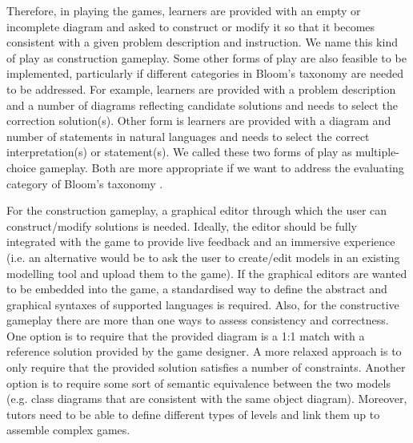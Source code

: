 \documentclass[conference]{IEEEtran}
\begin{document}
Therefore, in playing the games, learners are provided with an empty or incomplete diagram and asked to construct or modify it so that it becomes consistent with a given problem description and instruction. We name this kind of play as construction gameplay. Some other forms of play are also feasible to be implemented, particularly if different categories in Bloom's taxonomy \cite{krathwohl2002revision} are needed to be addressed. For example,  learners are provided with a problem description and a number of diagrams reflecting candidate solutions and needs to select the correction solution(s). Other form is learners are provided with a diagram and number of statements in natural languages and needs to select the correct interpretation(s) or statement(s). We called these two forms of play as multiple-choice gameplay. Both are more appropriate if we want to address the evaluating category of Bloom's taxonomy \cite{krathwohl2002revision}.

For the construction gameplay, a graphical editor through which the user can construct/modify solutions is needed. Ideally, the editor should be fully integrated with the game to provide live feedback and an immersive experience (i.e. an alternative would be to ask the user to create/edit models in an existing modelling tool and upload them to the game). If the graphical editors are wanted to be embedded into the game, a standardised way to define the abstract and graphical syntaxes of supported languages is required. Also, for the constructive gameplay there are more than one ways to assess consistency and correctness. One option is to require that the provided diagram is a 1:1 match with a reference solution provided by the game designer. A more relaxed approach is to only require that the provided solution satisfies a number of constraints. Another option is to require some sort of semantic equivalence between the two models (e.g. class diagrams that are consistent with the same object diagram). Moreover, tutors need to be able to define different types of levels and link them up to assemble complex games.
\end{document}
